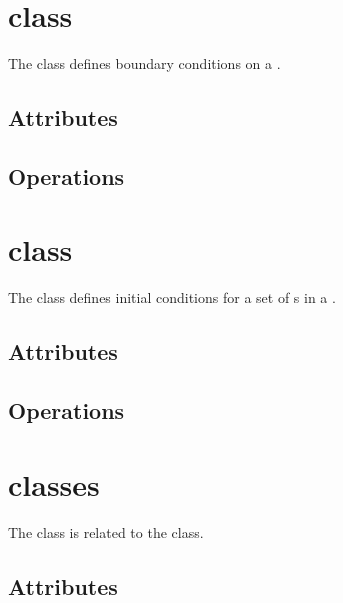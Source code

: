 \section{ class}

The  class defines boundary conditions on a .



\subsection{Attributes}

\subsection{Operations}

\section{ class}

The  class defines initial conditions for a set of
s in a .


\subsection{Attributes}

\subsection{Operations}

\section{ classes}

The  class is related to the  class.


\subsection{Attributes}

